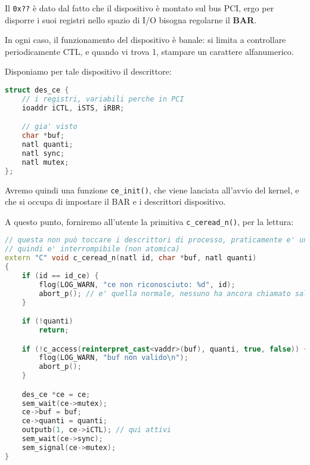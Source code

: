 \documentclass[a4paper,11pt]{article}
\begin{document}
Il \lstinline|0x??| è dato dal fatto che il dispositivo è montato sul bus PCI, ergo per disporre i suoi registri nello spazio di I/O bisogna regolarne il \textbf{BAR}.

In ogni caso, il funzionamento del dispositivo è banale: si limita a controllare periodicamente CTL, e quando vi trova 1, stampare un carattere alfanumerico.

Disponiamo per tale dispositivo il descrittore:
\begin{lstlisting}[language=C++, style=codestyle]	
struct des_ce {
	// i registri, variabili perche in PCI
	ioaddr iCTL, iSTS, iRBR;

	// gia' visto
	char *buf;
	natl quanti;
	natl sync;
	natl mutex;
};
\end{lstlisting}

Avremo quindi una funzione \lstinline|ce_init()|, che viene lanciata all'avvio del kernel, e che si occupa di impostare il BAR e i descrittori dispositivo. 

A questo punto, forniremo all'utente la primitiva \lstinline|c_ceread_n()|, per la lettura:
\begin{lstlisting}[language=C++, style=codestyle]	
// questa non può toccare i descrittori di processo, praticamente e' una chiamata di funzione,
// quindi e' interrompibile (non atomica)
extern "C" void c_ceread_n(natl id, char *buf, natl quanti)
{
	if (id == id_ce) {
		flog(LOG_WARN, "ce non riconosciuto: %d", id);
		abort_p(); // e' quella normale, nessuno ha ancora chiamato salva_stato
	}

	if (!quanti)
		return;

	if (!c_access(reinterpret_cast<vaddr>(buf), quanti, true, false)) {
		flog(LOG_WARN, "buf non valido\n");
		abort_p();
	}

	des_ce *ce = ce;
	sem_wait(ce->mutex);
	ce->buf = buf;
	ce->quanti = quanti;
	outputb(1, ce->iCTL); // qui attivi 
	sem_wait(ce->sync);
	sem_signal(ce->mutex);
}
\end{lstlisting}
\end{document}
